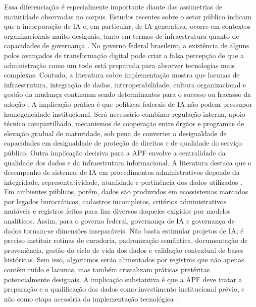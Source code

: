 \documentclass[12pt,a4paper]{article}
\begin{document}
Essa diferenciação é especialmente importante diante das assimetrias de maturidade observadas no corpus. Estudos recentes sobre o setor público indicam que a incorporação de IA e, em particular, de IA generativa, ocorre em contextos organizacionais muito desiguais, tanto em termos de infraestrutura quanto de capacidades de governança \autocite{mariano2026inteligencia} \autocite{lyrio2025emerging}. No governo federal brasileiro, a existência de alguns polos avançados de transformação digital pode criar a falsa percepção de que a administração como um todo está preparada para absorver tecnologias mais complexas. Contudo, a literatura sobre implementação mostra que lacunas de infraestrutura, integração de dados, interoperabilidade, cultura organizacional e gestão da mudança continuam sendo determinantes para o sucesso ou fracasso da adoção \autocite{sharma2021implementing} \autocite{david2023understanding}. A implicação prática é que políticas federais de IA não podem pressupor homogeneidade institucional. Será necessário combinar regulação interna, apoio técnico compartilhado, mecanismos de cooperação entre órgãos e programas de elevação gradual de maturidade, sob pena de converter a desigualdade de capacidades em desigualdade de proteção de direitos e de qualidade do serviço público.
Outra implicação decisiva para a APF envolve a centralidade da qualidade dos dados e da infraestrutura informacional. A literatura destaca que o desempenho de sistemas de IA em procedimentos administrativos depende da integridade, representatividade, atualidade e pertinência dos dados utilizados \autocite{parycek2023artificial}. Em ambientes públicos, porém, dados são produzidos em ecossistemas marcados por legados burocráticos, cadastros incompletos, critérios administrativos mutáveis e registros feitos para fins diversos daqueles exigidos por modelos analíticos. Assim, para o governo federal, governança de IA e governança de dados tornam-se dimensões inseparáveis. Não basta estimular projetos de IA; é preciso instituir rotinas de curadoria, padronização semântica, documentação de proveniência, gestão do ciclo de vida dos dados e validação contextual de bases históricas. Sem isso, algoritmos serão alimentados por registros que não apenas contêm ruído e lacunas, mas também cristalizam práticas pretéritas potencialmente desiguais. A implicação substantiva é que a APF deve tratar a preparação e a qualificação dos dados como investimento institucional prévio, e não como etapa acessória da implementação tecnológica \autocite{serra2024a} \autocite{pi2021machine}.
\end{document}
